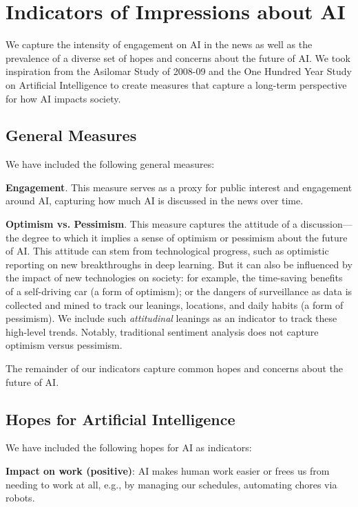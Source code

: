 \documentclass[letterpaper]{article}
\begin{document}
\section{Indicators of Impressions about AI}


We capture the intensity of engagement on AI in the news as well as the prevalence of a diverse set of hopes and concerns about the future of AI. We took inspiration from the Asilomar Study of 2008-09 \cite{asilomar} and the One Hundred Year Study on Artificial Intelligence \cite{100years} to create measures that capture a long-term perspective for how AI impacts society. %

\subsection{General Measures}
We have included the following general measures:

\textbf{Engagement}. This measure serves as a proxy for public interest and engagement around AI, capturing how much AI is discussed in the news over time.

\textbf{Optimism vs. Pessimism}. This measure captures the attitude of a discussion---the degree to which it implies a sense of optimism or pessimism about the future of AI. This attitude can stem from technological progress, such as optimistic reporting on new breakthroughs in deep learning. But it can also be influenced by the impact of new technologies on society: for example, the time-saving benefits of a self-driving car (a form of optimism); or the dangers of surveillance as data is collected and mined to track our leanings, locations, and daily habits (a form of pessimism). We include such \textit{attitudinal} leanings as an indicator to track these high-level trends. Notably, traditional sentiment analysis does not capture optimism versus pessimism.

The remainder of our indicators capture common hopes and concerns about the future of AI.

\subsection{Hopes for Artificial Intelligence}

We have included the following hopes for AI as indicators:

\textbf{Impact on work (positive)}: AI makes human work easier or frees us from needing to work at all, e.g., by managing our schedules, automating chores via robots.
\end{document}
